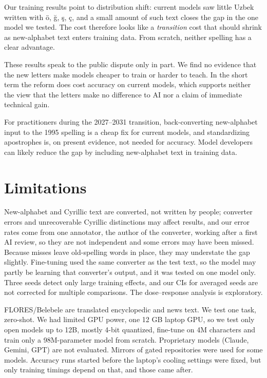 Our training results point to distribution shift: current models saw little Uzbek written with \"o, \u{g}, \c{s}, \c{c}, and a small amount of such text closes the gap in the one model we tested. The cost therefore looks like a \emph{transition} cost that should shrink as new-alphabet text enters training data. From scratch, neither spelling has a clear advantage.

These results speak to the public dispute only in part. We find no evidence that the new letters make models cheaper to train or harder to teach. In the short term the reform does cost accuracy on current models, which supports neither the view that the letters make no difference to AI nor a claim of immediate technical gain.

For practitioners during the 2027--2031 transition, back-converting new-alphabet input to the 1995 spelling is a cheap fix for current models, and standardizing apostrophes is, on present evidence, not needed for accuracy. Model developers can likely reduce the gap by including new-alphabet text in training data.

\section*{Limitations}
New-alphabet and Cyrillic text are converted, not written by people; converter errors and unrecoverable Cyrillic distinctions may affect results, and our error rates come from one annotator, the author of the converter, working after a first AI review, so they are not independent and some errors may have been missed. Because misses leave old-spelling words in place, they may understate the gap slightly. Fine-tuning used the same converter as the test text, so the model may partly be learning that converter's output, and it was tested on one model only. Three seeds detect only large training effects, and our CIs for averaged seeds are not corrected for multiple comparisons. The dose--response analysis is exploratory.

FLORES/Belebele are translated encyclopedic and news text. We test one task, zero-shot. We had limited GPU power, one 12 GB laptop GPU, so we test only open models up to 12B, mostly 4-bit quantized, fine-tune on 4M characters and train only a 98M-parameter model from scratch. Proprietary models (Claude, Gemini, GPT) are not evaluated. Mirrors of gated repositories were used for some models. Accuracy runs started before the laptop's cooling settings were fixed, but only training timings depend on that, and those came after.

